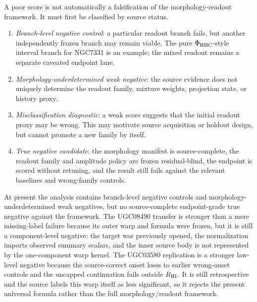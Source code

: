 \documentclass[11pt]{article}
\begin{document}
A poor score is not automatically a falsification of the morphology-readout
framework.  It must first be classified by source status.

\noindent{}

\begin{enumerate}[leftmargin=*]
\item \emph{Branch-level negative control}: a particular readout branch fails,
but another independently frozen branch may remain viable.  The pure
\(\Phi_{\rm HHC}\)-style interval branch for NGC7331 is an example; the mixed
readout remains a separate caveated endpoint lane.
\item \emph{Morphology-underdetermined weak negative}: the source evidence does
not uniquely determine the readout family, mixture weights, projection state, or
history proxy.
\item \emph{Misclassification diagnostic}: a weak score suggests that the
initial readout proxy may be wrong.  This may motivate source acquisition or
holdout design, but cannot promote a new family by itself.
\item \emph{True negative candidate}: the morphology manifest is source-complete,
the readout family and amplitude policy are frozen residual-blind, the endpoint
is scored without retuning, and the result still fails against the relevant
baselines and wrong-family controls.
\end{enumerate}
At present the analysis contains branch-level negative controls and
morphology-underdetermined weak negatives, but no source-complete endpoint-grade
true negative against the framework.  The UGC08490 transfer is stronger than a
mere missing-label failure because its outer warp and formula were frozen, but
it is still a component-level negative: the target was previously opened, the
normalization imports observed summary scalars, and the inner source body is not
represented by the one-component warp kernel.  The UGC03580 replication is a
stronger law-level negative because the source-correct onset loses to earlier
wrong-onset controls and the uncapped continuation fails outside
\(R_{\rm HI}\).  It is still retrospective and the source labels this warp
itself as less significant, so it rejects the present universal formula rather
than the full morphology/readout framework.
\end{document}
